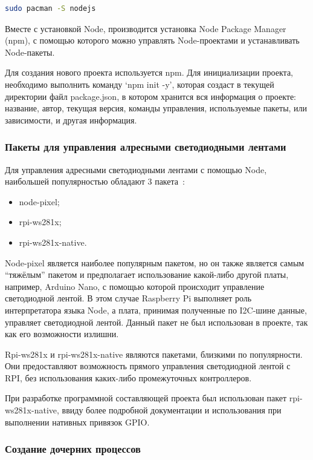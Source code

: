 \begin{lstlisting}[style=ES6, language=bash]
  sudo pacman -S nodejs
\end{lstlisting}

Вместе с установкой Node, производится установка Node Package Manager (npm), с помощью которого можно управлять Node-проектами и устанавливать Node-пакеты.

Для создания нового проекта используется npm. Для инициализации проекта, необходимо выполнить команду `npm init -y', которая создаст в текущей директории файл package.json, в котором хранится вся информация о проекте: название, автор, текущая версия, команды управления, используемые пакеты, или зависимости, и другая информация.

\subsubsection{Пакеты для управления алресными светодиодными лентами}

Для управления адресными светодиодными лентами с помощью Node, наибольшей популярностью обладают 3 пакета~\cite{npm}:

\begin{itemize}
  \item node-pixel;
  \item rpi-ws281x;
  \item rpi-ws281x-native.
\end{itemize}

Node-pixel является наиболее популярным пакетом, но он также является самым ``тяжёлым'' пакетом и предполагает использование какой-либо другой платы, например, Arduino Nano, с помощью которой происходит управление светодиодной лентой. В этом случае Raspberry Pi выполняет роль интерпретатора языка Node, а плата, принимая полученные по I2C-шине данные, управляет светодиодной лентой. Данный пакет не был использован в проекте, так как его возможности излишни.

Rpi-ws281x и rpi-ws281x-native являются пакетами, близкими по популярности. Они предоставляют возможность прямого управления светодиодной лентой с RPI, без использования каких-либо промежуточных контроллеров.

При разработке программной составляющей проекта был использован пакет rpi-ws281x-native, ввиду более подробной документации и использования при выполнении нативных привязок GPIO.

\subsubsection{Создание дочерних процессов}

